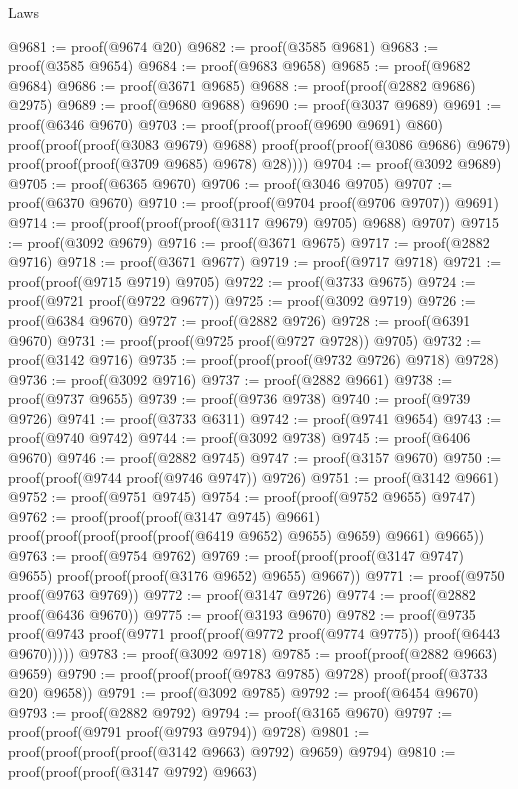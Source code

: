 \begin{lexlean}{Laws}
\begin{coremodule}
@9681 := proof(@9674 @20)
@9682 := proof(@3585 @9681)
@9683 := proof(@3585 @9654)
@9684 := proof(@9683 @9658)
@9685 := proof(@9682 @9684)
@9686 := proof(@3671 @9685)
@9688 := proof(proof(@2882 @9686) @2975)
@9689 := proof(@9680 @9688)
@9690 := proof(@3037 @9689)
@9691 := proof(@6346 @9670)
@9703 := proof(proof(proof(@9690 @9691) @860)
      proof(proof(proof(@3083 @9679) @9688)
          proof(proof(proof(@3086 @9686) @9679) proof(proof(proof(@3709 @9685) @9678) @28))))
@9704 := proof(@3092 @9689)
@9705 := proof(@6365 @9670)
@9706 := proof(@3046 @9705)
@9707 := proof(@6370 @9670)
@9710 := proof(proof(@9704 proof(@9706 @9707)) @9691)
@9714 := proof(proof(proof(proof(@3117 @9679) @9705) @9688) @9707)
@9715 := proof(@3092 @9679)
@9716 := proof(@3671 @9675)
@9717 := proof(@2882 @9716)
@9718 := proof(@3671 @9677)
@9719 := proof(@9717 @9718)
@9721 := proof(proof(@9715 @9719) @9705)
@9722 := proof(@3733 @9675)
@9724 := proof(@9721 proof(@9722 @9677))
@9725 := proof(@3092 @9719)
@9726 := proof(@6384 @9670)
@9727 := proof(@2882 @9726)
@9728 := proof(@6391 @9670)
@9731 := proof(proof(@9725 proof(@9727 @9728)) @9705)
@9732 := proof(@3142 @9716)
@9735 := proof(proof(proof(@9732 @9726) @9718) @9728)
@9736 := proof(@3092 @9716)
@9737 := proof(@2882 @9661)
@9738 := proof(@9737 @9655)
@9739 := proof(@9736 @9738)
@9740 := proof(@9739 @9726)
@9741 := proof(@3733 @6311)
@9742 := proof(@9741 @9654)
@9743 := proof(@9740 @9742)
@9744 := proof(@3092 @9738)
@9745 := proof(@6406 @9670)
@9746 := proof(@2882 @9745)
@9747 := proof(@3157 @9670)
@9750 := proof(proof(@9744 proof(@9746 @9747)) @9726)
@9751 := proof(@3142 @9661)
@9752 := proof(@9751 @9745)
@9754 := proof(proof(@9752 @9655) @9747)
@9762 := proof(proof(proof(@3147 @9745) @9661)
      proof(proof(proof(proof(proof(@6419 @9652) @9655) @9659) @9661) @9665))
@9763 := proof(@9754 @9762)
@9769 := proof(proof(proof(@3147 @9747) @9655) proof(proof(proof(@3176 @9652) @9655) @9667))
@9771 := proof(@9750 proof(@9763 @9769))
@9772 := proof(@3147 @9726)
@9774 := proof(@2882 proof(@6436 @9670))
@9775 := proof(@3193 @9670)
@9782 := proof(@9735
      proof(@9743 proof(@9771 proof(proof(@9772 proof(@9774 @9775)) proof(@6443 @9670)))))
@9783 := proof(@3092 @9718)
@9785 := proof(proof(@2882 @9663) @9659)
@9790 := proof(proof(proof(@9783 @9785) @9728) proof(proof(@3733 @20) @9658))
@9791 := proof(@3092 @9785)
@9792 := proof(@6454 @9670)
@9793 := proof(@2882 @9792)
@9794 := proof(@3165 @9670)
@9797 := proof(proof(@9791 proof(@9793 @9794)) @9728)
@9801 := proof(proof(proof(proof(@3142 @9663) @9792) @9659) @9794)
@9810 := proof(proof(proof(@3147 @9792) @9663)

\end{coremodule}
\end{lexlean}
